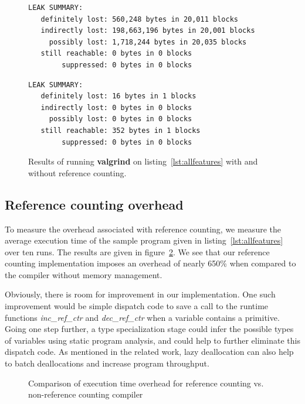 \documentclass{sigplanconf}
\newcommand{\afunction}[1]{\textit{#1}}
\begin{document}
\begin{figure}[ht]
\footnotesize
\begin{verbatim}
LEAK SUMMARY:
   definitely lost: 560,248 bytes in 20,011 blocks
   indirectly lost: 198,663,196 bytes in 20,001 blocks
     possibly lost: 1,718,244 bytes in 20,035 blocks
   still reachable: 0 bytes in 0 blocks
        suppressed: 0 bytes in 0 blocks
\end{verbatim}
\normalsize

\footnotesize
\begin{verbatim}
LEAK SUMMARY:
   definitely lost: 16 bytes in 1 blocks
   indirectly lost: 0 bytes in 0 blocks
     possibly lost: 0 bytes in 0 blocks
   still reachable: 352 bytes in 1 blocks
        suppressed: 0 bytes in 0 blocks
\end{verbatim}
\normalsize
\caption{Results of running \textbf{valgrind} on listing~\ref{lst:allfeatures} with and without reference counting.}
\label{fig:valgrind}
\end{figure}

\subsection{Reference counting overhead}

To measure the overhead associated with reference counting, we measure the average execution time of the sample program given in listing~\ref{lst:allfeatures} over ten runs.  The results are given in figure~\ref{fig:overhead}.  We see that our reference counting implementation imposes an overhead of nearly 650\% when compared to the compiler without memory management.  

Obviously, there is room for improvement in our implementation.  One such improvement would be simple dispatch code to save a call to the runtime functions \afunction{inc\_ref\_ctr} and \afunction{dec\_ref\_ctr} when a variable contains a primitive.  Going one step further, a type specialization stage could infer the possible types of variables using static program analysis, and could help to further eliminate this dispatch code.  As mentioned in the related work, lazy deallocation can also help to batch deallocations and increase program throughput.

\begin{figure}
\normalsize %

\caption{Comparison of execution time overhead for reference counting vs. non-reference counting compiler}
\label{fig:overhead}
\end{figure}
\end{document}
